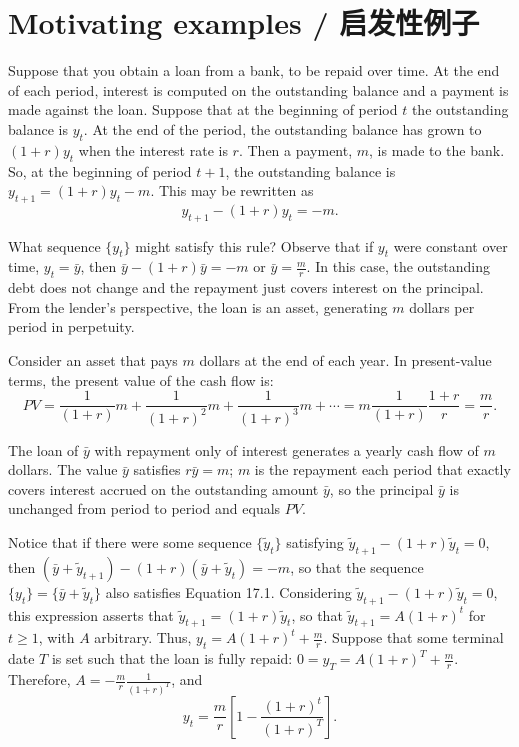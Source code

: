 \section{Motivating examples / 启发性例子}

\begin{original}
Suppose that you obtain a loan from a bank, to be repaid over time. At the end of each period, interest is computed on the outstanding balance and a payment is made against the loan. Suppose that at the beginning of period $t$ the outstanding balance is $y_t$. At the end of the period, the outstanding balance has grown to $(1 + r)y_t$ when the interest rate is $r$. Then a payment, $m$, is made to the bank. So, at the beginning of period $t+1$, the outstanding balance is $y_{t+1} = (1+r)y_t - m$. This may be rewritten as
\[
y_{t+1} - (1 + r)y_t = -m. \tag{17.1}
\]

What sequence $\{y_t\}$ might satisfy this rule? Observe that if $y_t$ were constant over time, $y_t = \bar{y}$, then $\bar{y} - (1 + r)\bar{y} = -m$ or $\bar{y} = \frac{m}{r}$. In this case, the outstanding debt does not change and the repayment just covers interest on the principal. From the lender's perspective, the loan is an asset, generating $m$ dollars per period in perpetuity.

Consider an asset that pays $m$ dollars at the end of each year. In present-value terms, the present value of the cash flow is:
\[
PV = \frac{1}{(1 + r)}m + \frac{1}{(1 + r)^2}m + \frac{1}{(1 + r)^3}m + \cdots = m\frac{1}{(1+r)}\frac{1+r}{r} = \frac{m}{r}. \tag{17.2}
\]

The loan of $\bar{y}$ with repayment only of interest generates a yearly cash flow of $m$ dollars. The value $\bar{y}$ satisfies $r\bar{y} = m$; $m$ is the repayment each period that exactly covers interest accrued on the outstanding amount $\bar{y}$, so the principal $\bar{y}$ is unchanged from period to period and equals $PV$.

Notice that if there were some sequence $\{\tilde{y}_t\}$ satisfying $\tilde{y}_{t+1} - (1 + r)\tilde{y}_t = 0$, then $(\bar{y} + \tilde{y}_{t+1}) - (1 + r)(\bar{y} + \tilde{y}_t) = -m$, so that the sequence $\{y_t\} = \{\bar{y} + \tilde{y}_t\}$ also satisfies Equation 17.1. Considering $\tilde{y}_{t+1} - (1 + r)\tilde{y}_t = 0$, this expression asserts that $\tilde{y}_{t+1} = (1 + r)\tilde{y}_t$, so that $\tilde{y}_{t+1} = A(1 + r)^t$ for $t \geq 1$, with $A$ arbitrary. Thus, $y_t = A(1 + r)^t + \frac{m}{r}$. Suppose that some terminal date $T$ is set such that the loan is fully repaid: $0 = y_T = A(1 + r)^T + \frac{m}{r}$. Therefore, $A = -\frac{m}{r}\frac{1}{(1+r)^T}$, and
\[
y_t = \frac{m}{r}\left[1 - \frac{(1 + r)^t}{(1 + r)^T}\right]. \tag{17.3}
\]


\end{original}
